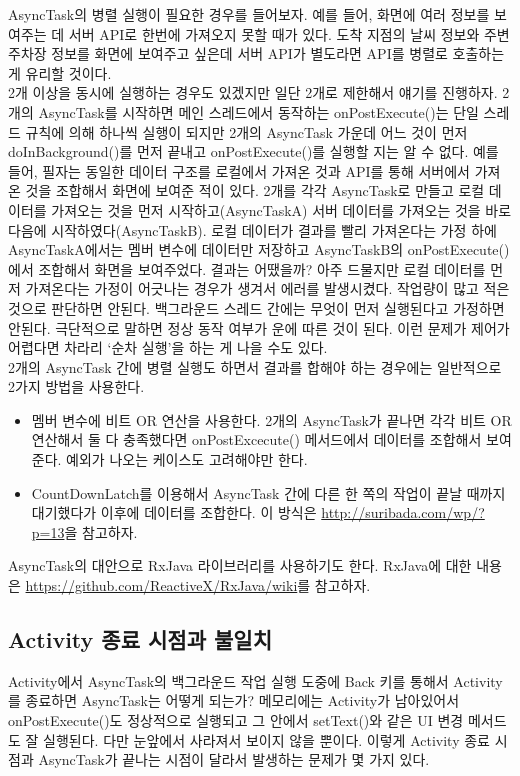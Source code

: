 AsyncTask의 병렬 실행이 필요한 경우를 들어보자. 
예를 들어, 화면에 여러 정보를 보여주는 데 서버 API로 한번에 가져오지 못할 때가 있다. 도착 지점의 날씨 정보와 주변 주차장 정보를 화면에 보여주고 싶은데 서버 API가 별도라면 API를 병렬로 호출하는 게 유리할 것이다.\\

2개 이상을 동시에 실행하는 경우도 있겠지만 일단 2개로 제한해서 얘기를 진행하자.   
2개의 AsyncTask를 시작하면 메인 스레드에서 동작하는 onPostExecute()는 단일 스레드 규칙에 의해 하나씩 실행이 되지만 2개의 AsyncTask 가운데 어느 것이 먼저 doInBackground()를 먼저 끝내고 onPostExecute()를 실행할 지는 알 수 없다. 
예를 들어, 필자는 동일한 데이터 구조를 로컬에서 가져온 것과 API를 통해 서버에서 가져온 것을 조합해서 화면에 보여준 적이 있다. 
2개를 각각 AsyncTask로 만들고 로컬 데이터를 가져오는 것을 먼저 시작하고(AsyncTaskA) 서버 데이터를 가져오는 것을 바로 다음에 시작하였다(AsyncTaskB). 
로컬 데이터가 결과를 빨리 가져온다는 가정 하에 AsyncTaskA에서는 멤버 변수에 데이터만 저장하고 AsyncTaskB의 onPostExecute()에서 조합해서 화면을 보여주었다.
결과는 어땠을까? 아주 드물지만 로컬 데이터를 먼저 가져온다는 가정이 어긋나는 경우가 생겨서 에러를 발생시켰다. 
작업량이 많고 적은 것으로 판단하면 안된다.
백그라운드 스레드 간에는 무엇이 먼저 실행된다고 가정하면 안된다. 극단적으로 말하면 정상 동작 여부가 운에 따른 것이 된다.
이런 문제가 제어가 어렵다면 차라리 `순차 실행'을 하는 게 나을 수도 있다.\\

2개의 AsyncTask 간에 병렬 실행도 하면서 결과를 합해야 하는 경우에는 일반적으로 2가지 방법을 사용한다.
\begin{itemize}
\item 멤버 변수에 비트 OR 연산을 사용한다. 2개의 AsyncTask가 끝나면 각각 비트 OR 연산해서 둘 다 충족했다면 onPostExcecute() 메서드에서 데이터를 조합해서 보여준다. 예외가 나오는 케이스도 고려해야만 한다. 
\item CountDownLatch를 이용해서 AsyncTask 간에 다른 한 쪽의 작업이 끝날 때까지 대기했다가 이후에 데이터를 조합한다. 이 방식은 \url{http://suribada.com/wp/?p=13}을 참고하자.
\end{itemize}

AsyncTask의 대안으로 RxJava 라이브러리를 사용하기도 한다. RxJava에 대한 내용은 \url{https://github.com/ReactiveX/RxJava/wiki}를 참고하자.

\subsection{Activity 종료 시점과 불일치}
Activity에서 AsyncTask의 백그라운드 작업 실행 도중에 Back 키를 통해서 Activity를 종료하면 AsyncTask는 어떻게 되는가? 메모리에는 Activity가 남아있어서 onPostExecute()도 정상적으로 실행되고 그 안에서 setText()와 같은 UI 변경 메서드도 잘 실행된다. 다만 눈앞에서 사라져서 보이지 않을 뿐이다.
이렇게 Activity 종료 시점과 AsyncTask가 끝나는 시점이 달라서 발생하는 문제가 몇 가지 있다.\\

